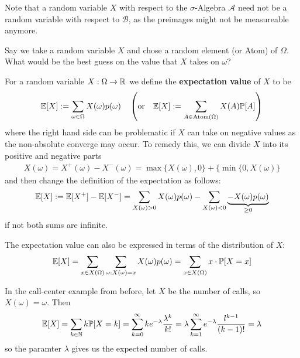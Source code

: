 Note that a random variable $X$ with respect to the $\sigma$-Algebra $\mathcal{A}$ need not be a random variable with respect to $\mathcal{B}$, as the preimages might not be measureable anymore.

Say we take a random variable $X$ and chose a random element (or Atom) of $\Omega$. What would be the best guess on the value that $X$ takes on $\omega$?

\begin{dfn}
  For a random variable $X: \Omega \to \mathbb{R}$ we define the \textbf{expectation value} of $X$ to be
  \begin{align*}
    \mathbb{E}[X] := \sum_{\omega \in \Omega}X(\omega) p(\omega) \quad \left(\text{or} \quad \mathbb{E}[X] := \sum_{A \in \text{Atom}(\Omega)} X(A)\mathbb{P}[A]
    \right)
  \end{align*}
  where the right hand side can be problematic if $X$ can take on negative values as the non-absolute converge may occur.
  To remedy this, we can divide $X$ into its positive and negative parts 
  \begin{align*}
    X(\omega) = X^+(\omega) - X^-(\omega) = \max\{X(\omega), 0\} + \{\min\{0, X(\omega)\}
  \end{align*}
  and then change the definition of the expectation as follows:
  \begin{align*}
    \mathbb{E}[X] := \mathbb{E}[X^+] - \mathbb{E}[X^-]= \sum_{X(\omega) > 0}X(\omega) p(\omega) - \sum_{X(\omega) < 0}\underbrace{-X(\omega)p(\omega)}_{\geq 0}
  \end{align*}
  if not both sums are infinite.
\end{dfn}
The expectation value can also be expressed in terms of the distribution of $X$:
\begin{align*}
  \mathbb{E}[X] = \sum_{x \in X(\Omega)} \sum_{\omega: X(\omega) = x} X(\omega) p(\omega) =
  \sum_{x \in X(\Omega)} x \cdot \mathbb{P}[X = x]
\end{align*}

\begin{ex}[]
  In the call-center example from before, let $X$ be the number of calls, so $X(\omega) = \omega$. Then
  \begin{align*}
    \mathbb{E}[X] = \sum_{k \in \mathbb{N}} k \mathbb{P}[X = k] = \sum_{k=0}^{\infty}k e^{-\lambda} \frac{\lambda^{k}}{k!} = \lambda \sum_{k=1}^{\infty}e^{-\lambda} \frac{l^{k-1}}{(k-1)!} = \lambda
  \end{align*}
  so the paramter $\lambda$ gives us the expected number of calls.
\end{ex}

